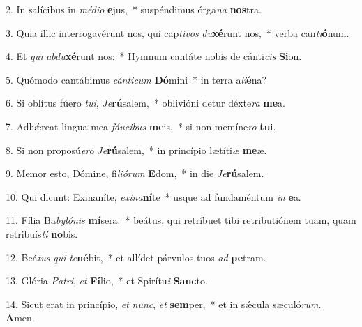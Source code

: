 2. In salícibus in \textit{mé}\textit{di}\textit{o} \textbf{e}jus,~*  suspéndimus órga\textit{na} \textbf{nos}tra.\

3. Quia illic interrogavérunt nos, qui cap\textit{tí}\textit{vos} \textit{du}\textbf{xé}runt nos,~*  verba can\textit{ti}\textbf{ó}num.\

4. Et \textit{qui} \textit{ab}\textit{du}\textbf{xé}runt nos:~*  Hymnum cantáte nobis de cánti\textit{cis} \textbf{Si}on.\

5. Quómodo cantábimus \textit{cán}\textit{ti}\textit{cum} \textbf{Dó}mini~*  in terra a\textit{li}\textbf{é}na?\

6. Si oblítus fúero \textit{tu}\textit{i}, \textit{Je}\textbf{rú}salem,~*  oblivióni detur déxte\textit{ra} \textbf{me}a.\

7. Adhǽreat lingua mea \textit{fáu}\textit{ci}\textit{bus} \textbf{me}is,~*  si non memíne\textit{ro} \textbf{tu}i.\

8. Si non proposú\textit{e}\textit{ro} \textit{Je}\textbf{rú}salem,~*  in princípio lætíti\textit{æ} \textbf{me}æ.\

9. Memor esto, Dómine, fi\textit{li}\textit{ó}\textit{rum} \textbf{E}dom,~*  in die \textit{Je}\textbf{rú}salem.\

10. Qui dicunt: Exinaníte, \textit{ex}\textit{i}\textit{na}\textbf{ní}te~*  usque ad fundaméntum \textit{in} \textbf{e}a.\

11. Fília Ba\textit{by}\textit{ló}\textit{nis} \textbf{mí}sera:~*  beátus, qui retríbuet tibi retributiónem tuam, quam retribuís\textit{ti} \textbf{no}bis.\

12. Beá\textit{tus} \textit{qui} \textit{te}\textbf{né}bit,~*  et allídet párvulos tuos \textit{ad} \textbf{pe}tram.\

13. Glória \textit{Pa}\textit{tri}, \textit{et} \textbf{Fí}lio,~*  et Spirítu\textit{i} \textbf{Sanc}to.\

14. Sicut erat in princípio, \textit{et} \textit{nunc}, \textit{et} \textbf{sem}per,~*  et in sǽcula sæculó\textit{rum}. \textbf{A}men.\

